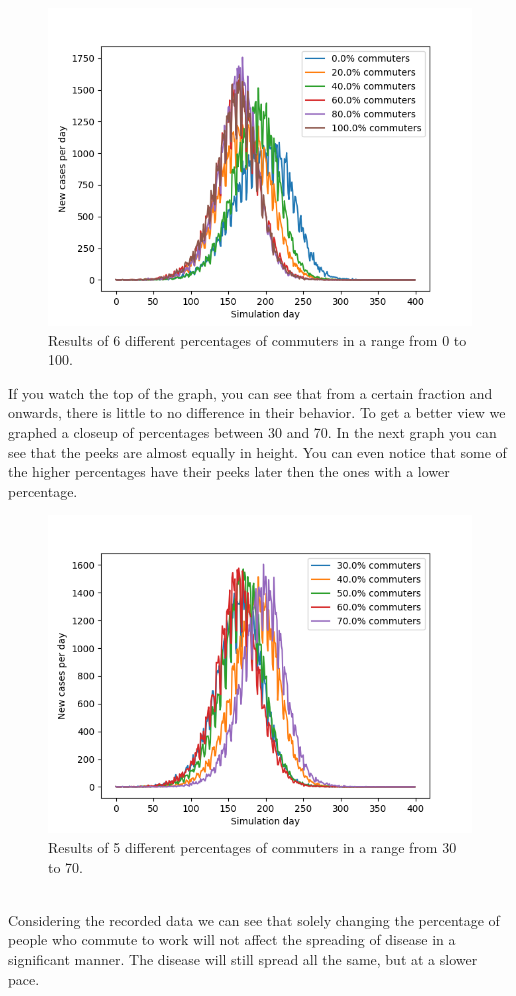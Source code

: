 \documentclass[runningheads]{llncs}
\begin{document}
\begin{figure}
	\includegraphics[width=\textwidth]{test_0-100.png}
	\caption{Results of 6 different percentages of commuters in a range from 0 to 100.}
\end{figure}
\newpage

If you watch the top of the graph, you can see that from a certain fraction and onwards, there is little to no difference in their behavior. To get a better view we graphed a closeup of percentages between 30 and 70. In the next graph you can see that the peeks are almost equally in height. You can even notice that some of the higher percentages have their peeks later then the ones with a lower percentage. 
\begin{figure}
	\includegraphics[width=\textwidth]{test_30-70.png}
	\caption{Results of 5 different percentages of commuters in a range from 30 to 70.}
\end{figure}
\\
Considering the recorded data we can see that solely changing the percentage of people who commute to work will not affect the spreading of disease in a significant manner. The disease will still spread all the same, but at a slower pace. 
\end{document}
